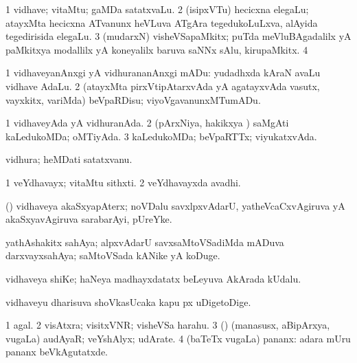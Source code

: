 {{{{{{\bentry
{} 
\gl{\nA}
\expl{}
\bmng
\bnum
\num{1} vidhave; vitaMtu; gaMDa satatxvaLu. 
\num{2} (isipxVTu) hecicxna elegaLu; atayxMta hecicxna ATvanunx heVLuva ATgAra tegedukoLuLxva, alAyida tegedirisida elegaLu. 
\num{3} (mudarxN) visheVSapaMkitx; puTda meVluBAgadalilx yA paMkitxya modallilx yA koneyalilx baruva saNNx sAlu, kirupaMkitx. 
\num{4}  
\enum
\emng
\eentry

\bentry
{} 
\gl{\sakirx}
\bmng
\bnum
\num{1} vidhaveyanAnxgi yA vidhurananAnxgi mADu:  yudadhxda kAraN avaLu vidhave AdaLu. 
\num{2} (atayxMta pirxVtipAtarxvAda yA agatayxvAda vasutx, vayxkitx, \mo variMda) beVpaRDisu; viyoVgavanunxMTumADu. 
\enum
\emng
\eentry

\bentry
{}
  \gl{\nA}\bmng
{} 
\emng
\eentry

\bentry
{}
  \gl{\gu}\bmng
\bnum
\num{1} vidhaveyAda yA vidhuranAda. 
\num{2} (pArxNiya, hakikxya \vi) saMgAti kaLedukoMDa; oMTiyAda. 
\num{3} kaLedukoMDa; beVpaRTTx; viyukatxvAda. 
\enum
\emng
\eentry

\bentry
{}
  \gl{\nA}\bmng
vidhura; heMDati satatxvanu. 
\emng
\eentry

\bentry
{}
  \gl{\nA}\bmng
\bnum
\num{1} veYdhavayx; vitaMtu sithxti.
\num{2} veYdhavayxda avadhi. 
\enum
\emng
\eentry

\bentry
{}
 \gl{\nA}\bmng
(\beY) vidhaveya akaSxyapAterx; noVDalu savxlpxvAdarU, yatheVcaCxvAgiruva yA akaSxyavAgiruva sarabarAyi, pUreYke. 
\emng
\eentry

\bentry
{}
 \gl{\nA}\bmng
yathAshakitx sahAya; alpxvAdarU savxsaMtoVSadiMda mADuva darxvayxsahAya; saMtoVSada kANike yA koDuge. 
\emng
\eentry

\bentry
{}
 \gl{\nA}\bmng
vidhaveya shiKe; haNeya madhayxdatatx beLeyuva  AkArada kUdalu. 
\emng
\eentry

\bentry
{}
 \gl{\nA}\bmng
vidhaveyu dharisuva shoVkasUcaka kapu px uDigetoDige. 
\emng
\eentry

\bentry
{} 
\gl{\nA}
\expl{}
\bmng
\bnum
\num{1} agal. 
\num{2} visAtxra; visitxVNR; visheVSa harahu. 
\num{3} (\rUpa) (manasusx, aBipArxya, \mo vugaLa) audAyaR; veYshAlyx; udArate. 
\num{4} (baTeTx \mo vugaLa) pananx:  adara mUru pananx beVkAgutatxde. 
\enum
\emng
\eentry

}}}}}}
